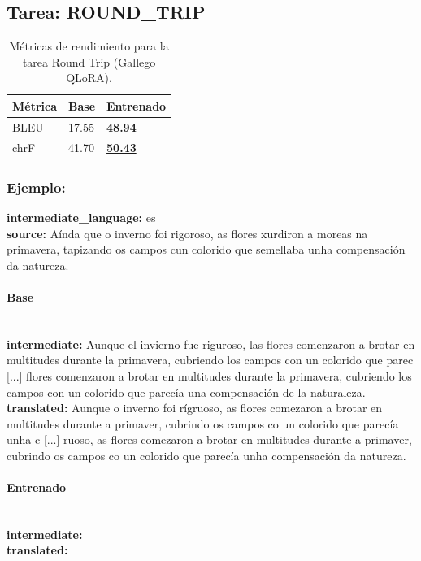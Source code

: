 \subsection{Tarea: ROUND\_TRIP}\label{tarea-round_trip}
\begin{longtable}[]{@{}lll@{}}
\toprule\noalign{}
Métrica & Base & Entrenado \\
\midrule\noalign{}
\endhead
\bottomrule\noalign{}
\caption{Métricas de rendimiento para la tarea Round Trip (Gallego QLoRA).}
\label{tab:metricas_round_trip_Gallego QLoRA}
\endlastfoot
BLEU & 17.55 & \textbf{\underline{48.94}} \\
chrF & 41.70 & \textbf{\underline{50.43}} \\
\end{longtable}

\subsubsection{Ejemplo:}
\textbf{intermediate\_language:} es\\
\textbf{source:} Aínda que o inverno foi rigoroso, as flores xurdiron a moreas na primavera, tapizando os campos cun colorido que semellaba unha compensación da natureza. 

\paragraph{Base}~\\
\textbf{intermediate:} Aunque el invierno fue riguroso, las flores comenzaron a brotar en multitudes durante la primavera, cubriendo los campos con un colorido que parec [...] flores comenzaron a brotar en multitudes durante la primavera, cubriendo los campos con un colorido que parecía una compensación de la naturaleza.\\
\textbf{translated:} Aunque o inverno foi rígruoso, as flores comezaron a brotar en multitudes durante a primaver, cubrindo os campos co un colorido que parecía unha c [...] ruoso, as flores comezaron a brotar en multitudes durante a primaver, cubrindo os campos co un colorido que parecía unha compensación da natureza.

\paragraph{Entrenado}~\\
\textbf{intermediate:} \\
\textbf{translated:} 

